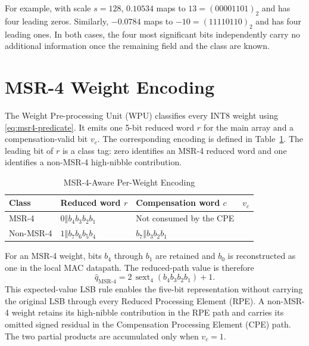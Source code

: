 \documentclass[12pt,a4paper]{report}
\newcommand{\msrfour}{\mathrm{MSR\text{-}4}}
\newcommand{\concat}{\mathbin\Vert}
\begin{document}
For example, with scale $s=128$, $0.10534$ maps to $13=(00001101)_2$ and has four leading zeros. Similarly, $-0.0784$ maps to $-10=(11110110)_2$ and has four leading ones. In both cases, the four most significant bits independently carry no additional information once the remaining field and the class are known.

\section{MSR-4 Weight Encoding}

The Weight Pre-processing Unit (WPU) classifies every INT8 weight using \eqref{eq:msr4-predicate}. It emits one 5-bit reduced word $r$ for the main array and a compensation-valid bit $v_c$. The corresponding encoding is defined in Table~\ref{tab:weight-encoding}. The leading bit of $r$ is a class tag: zero identifies an MSR-4 reduced word and one identifies a non-MSR-4 high-nibble contribution.

\begin{table}[H]
\centering
\caption{MSR-4-Aware Per-Weight Encoding}
\label{tab:weight-encoding}
\renewcommand{\arraystretch}{1.2}
\setlength{\tabcolsep}{10pt}
\begin{tabularx}{\textwidth}{>{\centering\arraybackslash}p{2.1cm}>{\centering\arraybackslash}X>{\centering\arraybackslash}X>{\centering\arraybackslash}p{1.0cm}}
\toprule
\textbf{Class} & \textbf{Reduced word $r$} & \textbf{Compensation word $c$} & \textbf{$v_c$} \\
\midrule
MSR-4 & $0\concat b_4b_3b_2b_1$ & Not consumed by the CPE & 0 \\
Non-MSR-4 & $1\concat b_7b_6b_5b_4$ & $b_7\concat b_3b_2b_1$ & 1 \\
\bottomrule
\end{tabularx}
\end{table}

For an MSR-4 weight, bits $b_4$ through $b_1$ are retained and $b_0$ is reconstructed as one in the local MAC datapath. The reduced-path value is therefore
\begin{equation}
    \hat{q}_{\msrfour}=2\,\operatorname{sext}_4(b_4b_3b_2b_1)+1.
    \label{eq:msr4-reconstruction}
\end{equation}
This expected-value LSB rule enables the five-bit representation without carrying the original LSB through every Reduced Processing Element (RPE). A non-MSR-4 weight retains its high-nibble contribution in the RPE path and carries its omitted signed residual in the Compensation Processing Element (CPE) path. The two partial products are accumulated only when $v_c=1$.
\end{document}
